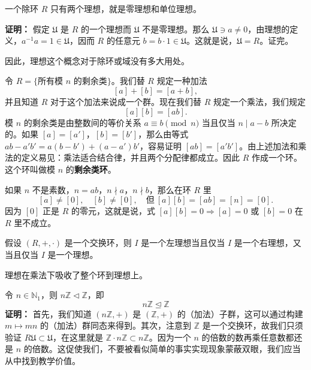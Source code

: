 \begin{theorem}[定理 1：除环只有两个理想]
一个除环 $R$ 只有两个理想，就是零理想和单位理想。

\textbf{证明：} 假定 $\mathfrak{U}$ 是 $R$ 的一个理想而 $\mathfrak{U}$ 不是零理想。那么 $\mathfrak{U}\ni a\ne 0$，由理想的定义，$a^{-1}a=1\in\mathfrak{U}$，因而 $R$ 的任意元 $b=b\cdot 1\in\mathfrak{U}$。这就是说，$\mathfrak{U}=R$。证完。

因此，理想这个概念对于除环或域没有多大用处。
\end{theorem}

\begin{example}
令 $R=\{\text{所有模 }n\text{ 的剩余类}\}$。我们替 $R$ 规定一种加法
\[
[a]+[b]=[a+b],
\]
并且知道 $R$ 对于这个加法来说成一个群。现在我们替 $R$ 规定一个乘法，我们规定
\[
[a][b]=[ab].
\]
模 $n$ 的剩余类是由整数间的等价关系 $a\equiv b\pmod{n}$ 当且仅当 $n\mid a-b$ 所决定的。如果 $[a]=[a']$，$[b]=[b']$，那么由等式 $ab-a'b'=a(b-b')+(a-a')b'$，容易证明 $[ab]=[a'b']$。由上述加法和乘法的定义易见：乘法适合结合律，并且两个分配律都成立。因此 $R$ 作成一个环。这个环叫做模 $n$ 的\textbf{剩余类环}。

如果 $n$ 不是素数，$n=ab$，$n\nmid a$，$n\nmid b$，那么在环 $R$ 里
\[
[a]\ne[0],\quad[b]\ne[0],\quad\text{但}\ [a][b]=[ab]=[n]=[0].
\]
因为 $[0]$ 正是 $R$ 的零元，这就是说，式 $[a][b]=0\Rightarrow[a]=0$ 或 $[b]=0$ 在 $R$ 里不成立。
\end{example}

\begin{proposition}
假设 $(R,+,\cdot)$ 是一个交换环，则 $I$ 是一个左理想当且仅当 $I$ 是一个右理想，又当且仅当 $I$ 是一个理想。

理想在乘法下吸收了整个环到理想上。
\end{proposition}

\begin{proposition}[命题 2.7：整环乘整数都是理想]
令 $n\in\mathbb{N}_1$，则 $n\mathbb{Z}\triangleleft\mathbb{Z}$，即
\[
n\mathbb{Z}\trianglelefteq\mathbb{Z}
\]
\textbf{证明：} 首先，我们知道 $(n\mathbb{Z},+)$ 是 $(\mathbb{Z},+)$ 的（加法）子群，这可以通过构建 $m\mapsto mn$ 的（加法）群同态来得到。其次，注意到 $\mathbb{Z}$ 是一个交换环，故我们只须验证 $R\mathfrak{U}\subset\mathfrak{U}$，在这里就是 $\mathbb{Z}\cdot n\mathbb{Z}\subset n\mathbb{Z}$。因为一个 $n$ 的倍数的数再乘任意数都还是 $n$ 的倍数。这促使我们，不要被看似简单的事实实现现象蒙蔽双眼，我们应当从中找到教学价值。
\end{proposition}


